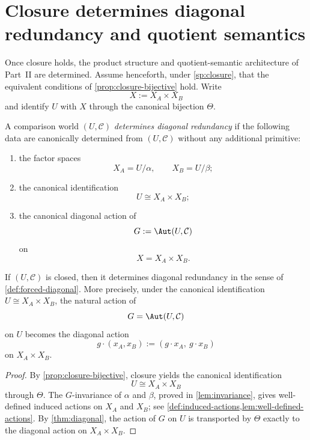 \section{Closure determines diagonal redundancy and quotient semantics}
\label{sec:closure-forces}
Once closure holds, the product structure and quotient-semantic
architecture of Part~II are determined.
Assume henceforth, under \cref{sp:closure}, that the equivalent conditions of
\cref{prop:closure-bijective} hold. Write
\[
	X:=X_A\times X_B
\]
and identify \(U\) with \(X\) through the canonical bijection
\(\Theta\).
\begin{definition}
	\label{def:forced-diagonal}
	A comparison world \((U,\mathcal C)\) \emph{determines diagonal redundancy}
	if the following data are canonically determined from \((U,\mathcal C)\)
	without any additional primitive:
	\begin{enumerate}[label=\textup{(\roman*)}]
		\item the factor spaces
		      \[
			      X_A=U/\alpha,
			      \qquad
			      X_B=U/\beta;
		      \]
		\item the canonical identification
		      \[
			      U\cong X_A\times X_B;
		      \]
		\item the canonical diagonal action of
		      \[
			      G:=\Aut(U,\mathcal C)
		      \]
		      on
		      \[
			      X=X_A\times X_B.
		      \]
	\end{enumerate}
\end{definition}
\begin{proposition}
	\label{prop:forced-diagonal-action}
	If \((U,\mathcal C)\) is closed, then it determines diagonal redundancy in
	the sense of \cref{def:forced-diagonal}. More precisely, under the
	canonical identification \(U\cong X_A\times X_B\), the natural action of
	\[
		G=\Aut(U,\mathcal C)
	\]
	on \(U\) becomes the diagonal action
	\[
		g\cdot(x_A,x_B):=(g\cdot x_A,\ g\cdot x_B)
	\]
	on \(X_A\times X_B\).
\end{proposition}
\begin{proof}
	By \cref{prop:closure-bijective}, closure yields the canonical
	identification
	\[
		U\cong X_A\times X_B
	\]
	through \(\Theta\). The \(G\)-invariance of \(\alpha\) and \(\beta\),
	proved in \cref{lem:invariance}, gives well-defined induced actions on
	\(X_A\) and \(X_B\); see
	\cref{def:induced-actions,lem:well-defined-actions}. By
	\cref{thm:diagonal}, the action of \(G\) on \(U\) is transported by
	\(\Theta\) exactly to the diagonal action on \(X_A\times X_B\).
\end{proof}

